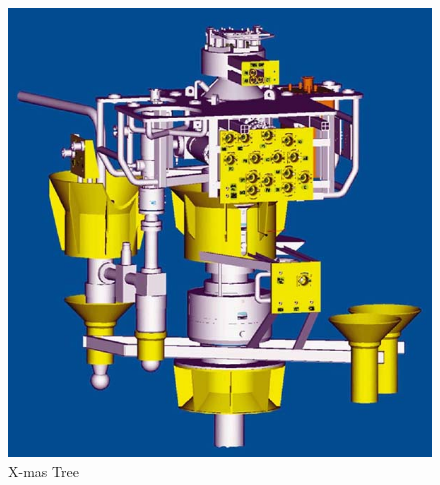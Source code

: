 \documentclass[a4paper,norsk]{article}
\begin{document}
\begin{figure}[h!]  
  \centering
  \caption{X-mas Tree}
  \includegraphics[scale=0.4]{xmas.jpg}
\end{figure}
\end{document}

